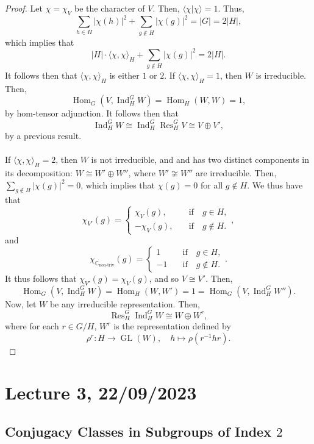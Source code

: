 \documentclass[a4paper]{report}
\theoremstyle{definition}
\theoremstyle{remark}
\theoremstyle{proposition}
\theoremstyle{conjecture}
\theoremstyle{lemma}
\theoremstyle{corollary}
\theoremstyle{exercise}
\theoremstyle{example}
\newcommand{\C}{\mathbb{C}}
\newcommand{\on}{\operatorname}
\begin{document}
\begin{proof}
    Let $\chi = \chi_V$ be the character of $V$. 
    Then, $\langle\chi\vert\chi\rangle=1$. 
    Thus,
    $$\sum_{h\in H} \vert\chi(h)\vert^2 + \sum_{g\not\in H}\vert \chi(g)\vert^2 = \vert G\vert = 2\vert H\vert,$$ 
    which implies that $$\vert H\vert\cdot \langle \chi,\chi\rangle_H + \sum_{g\not\in H} \vert \chi(g)\vert^2 = 2\vert H\vert.$$
    It follows then that 
    $\langle\chi,\chi\rangle_H$ is either $1$ or $2$.
    If $\langle\chi,\chi\rangle_H=1$, then $W$ is irreducible.
    Then,
    $$\on{Hom}_G(V,\on{Ind}_H^GW) = \on{Hom}_H(W,W) = 1,$$
    by hom-tensor adjunction.
    It follows then that
    $$\on{Ind}_H^GW \cong \on{Ind}_H^G\on{Res}_H^GV \cong V\oplus V',$$
    by a previous result.\\\\
    If $\langle\chi,\chi\rangle_H = 2$, then $W$ is not irreducible, and
    and has two distinct components in its decomposition:
    $W \cong W' \oplus W''$, where $W' \not\cong W''$ are irreducible.
    Then, $\sum_{g\not\in H}\vert\chi(g)\vert^2 = 0$, which implies that 
    $\chi(g) = 0$ for all $g\not\in H$.
    We thus have that 
    $$\chi_{V'}(g) = \begin{cases}
        \chi_V(g),\quad &\text{if} \quad g\in H,\\
        -\chi_V(g),\quad &\text{if} \quad g\not\in H.
    \end{cases},$$
    and 
    $$\chi_{\C_{\on{non-triv}}}(g) = \begin{cases}
        1\quad &\text{if}\quad g\in H,\\
        -1 \quad &\text{if}\quad g \not\in H.
    \end{cases}.$$
    It thus follows that $\chi_{V'}(g) = \chi_V(g)$, and 
    so $V\cong V'$.
    Then,
    $$\on{Hom}_G(V,\on{Ind}_H^GW) = \on{Hom}_H(W,W') = 1 = \on{Hom}_G(V,\on{Ind}_H^GW'').$$
    Now, let $W$ be any irreducible representation. Then, 
    $$\on{Res}_H^G\on{Ind}_H^GW \cong W\oplus W^r,$$
    where for each $r \in G/H$, $W^r$ is the representation defined by 
    $$\rho^r : H \longrightarrow \on{GL}(W),\quad h\longmapsto \rho(r^{-1}hr).$$
\end{proof}



\section{Lecture 3, 22/09/2023}

\subsection{Conjugacy Classes in Subgroups of Index $2$}
\end{document}
